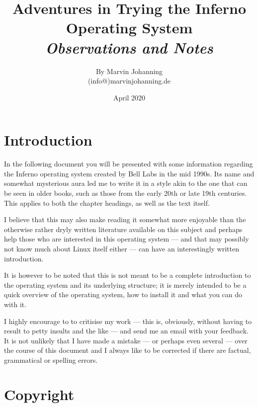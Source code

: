 \documentclass[a4paper,12pt]{report}
\begin{document}

\title{%
  Adventures in Trying the Inferno Operating System \\
  \textit{Observations and Notes}
}
\author{By Marvin Johanning\\(info@)marvinjohanning.de}
\date{April 2020}
\maketitle
\pagebreak

\tableofcontents
\pagebreak

\chapter*{Introduction}
In the following document you will be presented with some information regarding the Inferno operating system created by Bell Labs in the mid 1990s. Its name and somewhat mysterious aura led me to write it in a style akin to the one that can be seen in older books, such as those from the early 20th or late 19th centuries. This applies to both the chapter headings, as well as the text itself.

I believe that this may also make reading it somewhat more enjoyable than the otherwise rather dryly written literature available on this subject and perhaps help those who are interested in this operating system — and that may possibly not know much about Linux itself either — can have an interestingly written introduction.

It is however to be noted that this is not meant to be a complete introduction to the operating system and its underlying structure; it is merely intended to be a quick overview of the operating system, how to install it and what you can do with it.

I highly encourage to to critisise my work — this is, obviously, without having to result to petty insults and the like — and send me an email with your feedback. It is not unlikely that I have made a mistake — or perhaps even several — over the course of this document and I always like to be corrected if there are factual, grammatical or spelling errors.
\pagebreak

\chapter*{Copyright}
\end{document}
